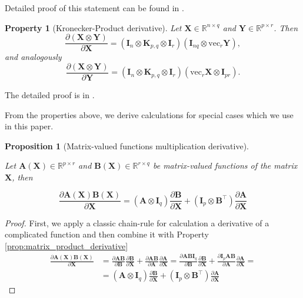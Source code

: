 \documentclass{article}
\newtheorem{proposition}{Proposition}
\newtheorem{property}{Property}
\begin{document}
Detailed proof of this statement can be found in \cite{singh2021analyticinsightsstructurerank}.

\begin{property} [Kronecker-Product derivative] \label{prop:kronecker_product_derivative}
    Let \( \mathbf{X} \in \mathbb{R}^{n \times q} \) and \( \mathbf{Y} \in \mathbb{R}^{p \times r} \). Then
\[
\frac{\partial (\mathbf{X} \otimes \mathbf{Y})}{\partial \mathbf{X}} = (\mathbf{I}_n \otimes \mathbf{K}_{p,q} \otimes \mathbf{I}_r) \left( \mathbf{I}_{nq} \otimes \mathrm{vec}_r \mathbf{Y} \right),
\]
and analogously
\[
\frac{\partial (\mathbf{X} \otimes \mathbf{Y})}{\partial \mathbf{Y}} = (\mathbf{I}_n \otimes \mathbf{K}_{p,q} \otimes \mathbf{I}_r) \left( \mathrm{vec}_r \mathbf{X} \otimes \mathbf{I}_{pr} \right).
\]
\end{property}

The detailed proof is in \cite{ormaniec2024attentionhessian}.

From the properties above, we derive calculations for special cases which we use in this paper.

\begin{proposition} [Matrix-valued functions multiplication derivative] \label{prop:matrix_funcs_product_derivative}

Let  $\mathbf{A}(\mathbf{X}) \in \mathbb{R}^{p \times r}$ and $\mathbf{B}(\mathbf{X}) \in \mathbb{R}^{r \times q}$ be matrix-valued functions of the matrix $\mathbf{X}$, then

\begin{equation*}
    \frac{\partial\mathbf{A}(\mathbf{X}) \mathbf{B}(\mathbf{X})}{\partial \mathbf{X}} = \left(\mathbf{A} \otimes \mathbf{I}_q 
 \right) \frac{\partial\mathbf{B}}{\partial\mathbf{X}} + \left( \mathbf{I}_p \otimes \mathbf{B}^\top\right) \frac{\partial\mathbf{A}}{\partial\mathbf{X}}
\end{equation*}
    
\end{proposition}

\begin{proof}
    First, we apply  a classic chain-rule for calculation a derivative of a complicated function and then combine it with Property \ref{prop:matrix_product_derivative}
    \begin{align*}
        \frac{\partial\mathbf{A}(\mathbf{X}) \mathbf{B}(\mathbf{X})}{\partial \mathbf{X}} &= \frac{\partial \mathbf{A}\mathbf{B}}{\partial\mathbf{B}}\frac{\partial\mathbf{B}}{\partial \mathbf{X}} + \frac{\partial \mathbf{A}\mathbf{B}}{\partial\mathbf{A}}\frac{\partial\mathbf{A}}{\partial \mathbf{X}} = \frac{\partial \mathbf{A}\mathbf{B}\mathbf{I}_q}{\partial\mathbf{B}}\frac{\partial\mathbf{B}}{\partial \mathbf{X}} + \frac{\partial \mathbf{I}_p\mathbf{A}\mathbf{B}}{\partial\mathbf{A}}\frac{\partial\mathbf{A}}{\partial \mathbf{X}} = \\
        &= \left( \mathbf{A} \otimes \mathbf{I}_q \right) \frac{\partial \mathbf{B}}{\partial \mathbf{X}} + \left( \mathbf{I}_p \otimes \mathbf{B}^\top \right) \frac{\partial \mathbf{A}}{\partial \mathbf{X}}
    \end{align*}
\end{proof}
\end{document}
